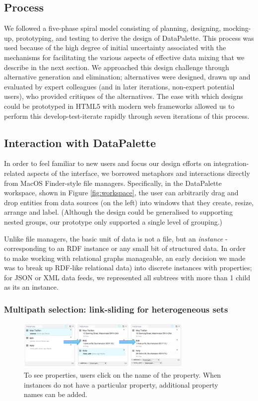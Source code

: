 \documentclass{sigchi}
\begin{document}
\subsection{Process}
We followed a five-phase spiral model consisting of planning, designing, mocking-up, prototyping, and testing to derive the design of DataPalette.  This process was used because of the high degree of initial uncertainty associated with the mechanisms for facilitating the various aspects of effective data mixing that we describe in the next section. We approached this design challenge through alternative generation and elimination; alternatives were designed, drawn up and evaluated by expert colleagues (and in later iterations, non-expert potential users), who provided critiques of the alternatives. The ease with which designs could be prototyped in HTML5 with modern web frameworks allowed us to perform this develop-test-iterate rapidly through seven iterations of this process.

\subsection{Interaction with DataPalette}
In order to feel familiar to new users and focus our design efforts on integration-related aspects of the interface, we borrowed metaphors and interactions directly from MacOS Finder-style file managers.  Specifically, in the DataPalette workspace, shown in Figure \ref{fig:workspace}, the user can arbitrarily drag and drop entities from data sources (on the left) into windows that they create, resize, arrange and label. (Although the design could be generalised to supporting nested groups, our prototype only supported a single level of grouping.)

Unlike file managers, the basic unit of data is not a file, but an \emph{instance} - corresponding to an RDF instance or any small bit of structured data. In order to make working with relational graphs manageable, an early decision we made was to break up RDF-like relational data) into discrete instances with properties; for JSON or XML data feeds, we represented all subtrees with more than 1 child as its an instance.  

\subsubsection{Multipath selection: link-sliding for heterogeneous sets}

\begin{figure}[htbp]
\begin{center}
\includegraphics[width=8.5cm]{img/multipathing}
\caption{To see properties, users click on the name of the property. When instances do not have a particular property, additional property names can be added.}
\label{fig:multipathing}
\end{center}
\end{figure}
\end{document}
